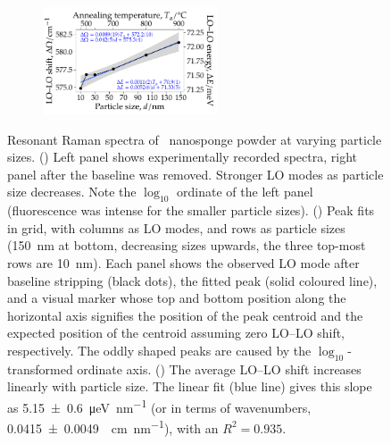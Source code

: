 \documentclass[webedition,openright,titles,swedish,english]{LuaUUThesis}\usepackage[]{graphicx}\usepackage[]{xcolor}
\newenvironment{knitrout}{}{} %
\begin{document}
\begin{figure}[tbp]
\begin{subfigure}{0.55\textwidth}
\begin{knitrout}
{}


\end{knitrout}
\caption{}
\label{fig:P25-UVRaman-peaks-in-grid}
\end{subfigure}%
\,%
\begin{subfigure}{0.43\textwidth}
\centering
\begin{knitrout}\scriptsize
{}\color{fgcolor}

{\centering \includegraphics[width=2.03in]{figure/0525P-fig-UVRaman-meanLOLO-vs-diameter-1} 

}


\end{knitrout}
\caption{}
\label{fig:P25-UVRaman-meanLOLO-vs-diameter}
\end{subfigure}%
\caption[Resonant Raman spectra]{%
   Resonant Raman spectra of \ZnO\ nanosponge powder at varying particle sizes.
   ()
   Left panel shows experimentally recorded spectra,
   right panel after the baseline was removed.
   Stronger LO modes as particle size decreases.
   Note the $\log_{10}$ ordinate of the left panel
   (fluorescence was intense for the smaller particle sizes).
   ()
   Peak fits in grid, with columns as LO modes, and rows as particle sizes
   (\qty{150}{\nm} at bottom, decreasing sizes upwards, the three top-most rows are \qty{10}{\nm}).
   Each panel shows the observed LO mode after baseline stripping (black dots),
   the fitted peak (solid coloured line), and a visual marker whose top and bottom
   position along the horizontal axis signifies the position of the peak centroid
   and the expected position of the centroid assuming zero LO--LO shift, respectively.
   The oddly shaped peaks are caused by the $\log_{10}$-transformed ordinate axis.
   ()
   The average LO--LO shift increases linearly with particle size.
   The linear fit (blue line) gives this slope as
   \qty{5.15\pm0.6}{\micro\eV\per\nm}
   (or in terms of wavenumbers,
   \qty{0.0415\pm0.0049}{\per\cm\per\nm}),
   with an $R^2=\num{0.935}$.
}
\label{fig:P25-UVRaman-spectra}
\end{figure}
\end{document}
